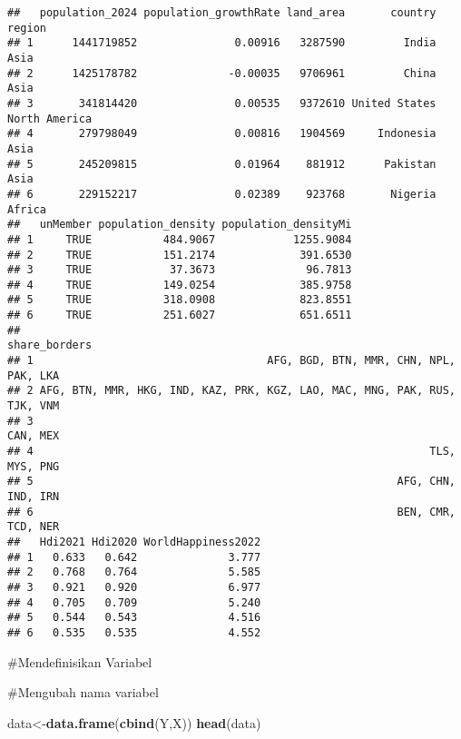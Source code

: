 \documentclass[
]{article}
\newenvironment{Shaded}{\begin{snugshade}}{\end{snugshade}}
\newcommand{\FunctionTok}[1]{\textcolor[rgb]{0.13,0.29,0.53}{\textbf{#1}}}
\newcommand{\NormalTok}[1]{#1}
\newcommand{\OtherTok}[1]{\textcolor[rgb]{0.56,0.35,0.01}{#1}}
\newcommand{\SpecialCharTok}[1]{\textcolor[rgb]{0.81,0.36,0.00}{\textbf{#1}}}
\begin{document}
\begin{verbatim}
##   population_2024 population_growthRate land_area       country        region
## 1      1441719852               0.00916   3287590         India          Asia
## 2      1425178782              -0.00035   9706961         China          Asia
## 3       341814420               0.00535   9372610 United States North America
## 4       279798049               0.00816   1904569     Indonesia          Asia
## 5       245209815               0.01964    881912      Pakistan          Asia
## 6       229152217               0.02389    923768       Nigeria        Africa
##   unMember population_density population_densityMi
## 1     TRUE           484.9067            1255.9084
## 2     TRUE           151.2174             391.6530
## 3     TRUE            37.3673              96.7813
## 4     TRUE           149.0254             385.9758
## 5     TRUE           318.0908             823.8551
## 6     TRUE           251.6027             651.6511
##                                                               share_borders
## 1                                    AFG, BGD, BTN, MMR, CHN, NPL, PAK, LKA
## 2 AFG, BTN, MMR, HKG, IND, KAZ, PRK, KGZ, LAO, MAC, MNG, PAK, RUS, TJK, VNM
## 3                                                                  CAN, MEX
## 4                                                             TLS, MYS, PNG
## 5                                                        AFG, CHN, IND, IRN
## 6                                                        BEN, CMR, TCD, NER
##   Hdi2021 Hdi2020 WorldHappiness2022
## 1   0.633   0.642              3.777
## 2   0.768   0.764              5.585
## 3   0.921   0.920              6.977
## 4   0.705   0.709              5.240
## 5   0.544   0.543              4.516
## 6   0.535   0.535              4.552
\end{verbatim}

\#Mendefinisikan Variabel

\begin{Shaded}
\end{Shaded}

\#Mengubah nama variabel

\begin{Shaded}
\begin{Highlighting}[]
\NormalTok{data}\OtherTok{\textless{}{-}}\FunctionTok{data.frame}\NormalTok{(}\FunctionTok{cbind}\NormalTok{(Y,X))}
\FunctionTok{head}\NormalTok{(data)}
\end{Highlighting}
\end{Shaded}
\end{document}
